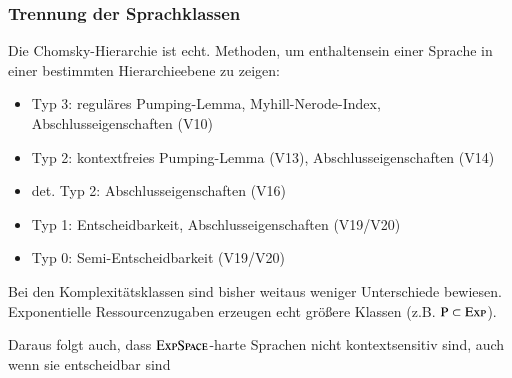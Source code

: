 \documentclass[onlymath]{beamer}
\begin{document}
\begin{frame}[t]
{{}}

\end{frame}

\begin{frame}\frametitle{Trennung der Sprachklassen}

Die Chomsky-Hierarchie ist echt. Methoden, um 
enthaltensein einer Sprache in einer bestimmten Hierarchieebene zu zeigen:

\begin{itemize}
\item \alert{Typ 3}: reguläres Pumping-Lemma, Myhill-Nerode-Index, Abschlusseigenschaften (V10)
\item \alert{Typ 2}: kontextfreies Pumping-Lemma (V13), Abschlusseigenschaften (V14)
\item \alert{det. Typ 2}: Abschlusseigenschaften (V16)
\item \alert{Typ 1}: Entscheidbarkeit, Abschlusseigenschaften (V19/V20)
\item \alert{Typ 0}: Semi-Entscheidbarkeit (V19/V20)
\end{itemize}

Bei den Komplexitätsklassen sind bisher weitaus weniger Unterschiede bewiesen.
Exponentielle Ressourcenzugaben erzeugen echt größere Klassen (z.B. ${\textsc{P}}\subset{\textsc{Exp}}$).
\medskip

\textcolor{devilscss}{Daraus folgt auch, dass ${\textsc{ExpSpace}}$-harte Sprachen nicht kontextsensitiv sind, auch wenn sie entscheidbar sind}

\end{frame}


\newcommand{\myyes}{$\textcolor{darkgreen}{\checkmark}$}
\newcommand{\myno}{$\textcolor{darkred}{\times}$}
\end{document}
